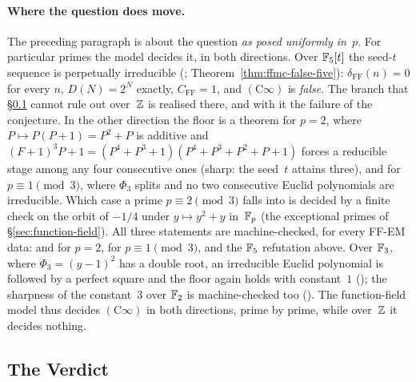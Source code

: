 \paragraph{Where the question does move.}
The preceding paragraph is about the question \emph{as posed uniformly
in~$p$}.  For particular primes the model decides it, in both directions.
Over $\mathbb{F}_5[t]$ the seed-$t$ sequence is perpetually irreducible
(;
Theorem~\ref{thm:ffmc-false-five}): $\delta_{\mathrm{FF}}(n) = 0$ for every
$n$, $D(N) = 2^N$ exactly, $C_{\mathrm{FF}} = 1$, and
$(\mathrm{C}\infty)$ is \emph{false}.  The branch that
\S\ref{sec:cinfty-verdict} cannot rule out over~$\mathbb{Z}$ is realised there,
and with it the failure of the conjecture.  In the other direction the
floor is a theorem for $p = 2$, where $P \mapsto P(P+1) = P^2 + P$ is
additive and $(F+1)^3P + 1 = (P^4+P^3+1)(P^4+P^3+P^2+P+1)$ forces a
reducible stage among any four consecutive ones (sharp: the seed~$t$
attains three), and for $p \equiv 1 \pmod 3$, where $\Phi_3$ splits and no
two consecutive Euclid polynomials are irreducible.  Which case a prime
$p \equiv 2 \pmod 3$ falls into is decided by a finite check on the orbit
of $-1/4$ under $y \mapsto y^2+y$ in~$\mathbb{F}_p$ (the exceptional primes of
\S\ref{sec:function-field}).  All three statements are machine-checked,
for every FF-EM data:
and
for $p = 2$,
for $p \equiv 1 \pmod 3$, and the $\mathbb{F}_5$ refutation above.  Over $\mathbb{F}_3$,
where $\Phi_3 = (y-1)^2$ has a double root, an irreducible Euclid
polynomial is followed by a perfect square and the floor again holds with
constant~$1$ ();
the sharpness of the constant~$3$ over $\mathbb{F}_2$ is machine-checked too
().  The
function-field model thus decides $(\mathrm{C}\infty)$ in both directions,
prime by prime, while over~$\mathbb{Z}$ it decides nothing.

\subsection{The Verdict}
\label{sec:cinfty-verdict}

